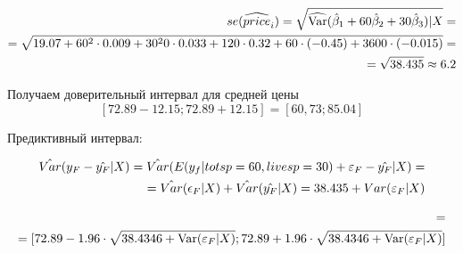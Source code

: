 \begin{problem}
\begin{sol}
\begin{align*}
se(\widehat{price}_i)=\sqrt{\widehat{\operatorname{Var}}(\hat{\beta}_1+60\hat{\beta}_2+30\hat{\beta}_3)|X} = \\
= \sqrt{19.07+60^2\cdot 0.009+30^20\cdot 0.033+120\cdot 0.32+60  \cdot (-0.45)+3600\cdot (-0.015)} = \\
= \sqrt{38.435}\approx 6.2 
\end{align*}

Получаем доверительный интервал для средней цены
\[
  [72.89-12.15; 72.89+12.15] = [60,73; 85.04]
\]

Предиктивный интервал:

\begin{align*}
\hat{Var}(y_F-\hat{y_F}|X)= \hat{Var}(E(y_f|totsp=60, livesp=30) +\varepsilon_F-\hat{y_F}|X) = \\
=\hat{Var}(\epsilon_F|X)+ \hat{Var}(\hat{y_F}|X)= 38.435+Var(\varepsilon_F|X)
\end{align*}

\begin{align*}
[\hat y_F-1.96\cdot \sqrt{38.4346+\Var(\e_F|X)}; \hat y_F+1.96\cdot \sqrt{38.4346+\Var(\e_F|X)}] = \\
= [72.89-1.96\cdot \sqrt{38.4346+\Var(\e_F|X)}; 72.89+1.96\cdot \sqrt{38.4346+\Var(\e_F|X)}]
\end{align*}

\end{sol}
\end{problem}




